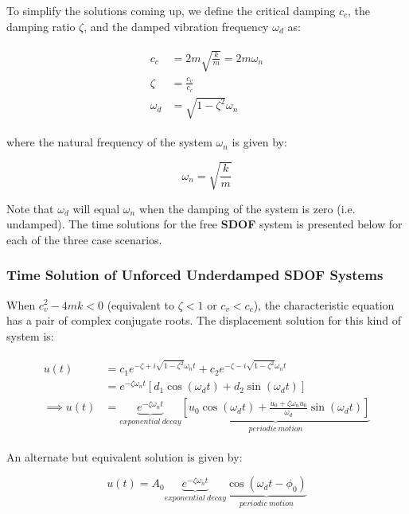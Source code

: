 \documentclass[10pt,b5paper,titlepage]{book}
\newenvironment{ematrix}
{
    \begin{eqnarray}
        \begin{aligned}
}
{
        \end{aligned}
    \end{eqnarray}
}
\begin{document}
To simplify the solutions coming up, we define the critical damping $ c_c $,
the damping ratio $ \zeta $, and the damped vibration frequency $ \omega_d $ as:

\begin{ematrix}
    c_c &= 2 m \sqrt{\frac{k}{m}} = 2 m \omega_n\\
    \zeta &= \frac{c_v}{c_c}\\
    \omega_d &= \sqrt{1 - \zeta^2} \omega_n
\end{ematrix}

where the natural frequency of the system $ \omega_n $ is given by:

\begin{equation}
    \omega_n = \sqrt{\frac{k}{m}}
\end{equation}

Note that $ \omega_d $ will equal $ \omega_n $ when the damping of the system
is zero (i.e. undamped). The time solutions for the free \textbf{SDOF}
system is presented below for each of the three case scenarios.

\subsubsection{Time Solution of Unforced Underdamped SDOF Systems}

When $ c_v^2 - 4 m k < 0 $ (equivalent to $ \zeta < 1 $ or $ c_v < c_c $),
the characteristic equation has a pair of complex conjugate roots. The displacement
solution for this kind of system is:

\begin{ematrix}
    u(t) &= c_1 e^{-\zeta + i \sqrt{1 - \zeta^2} \omega_n t}
          + c_2 e^{-\zeta - i \sqrt{1 - \zeta^2} \omega_n t}\\
         &= e^{-\zeta \omega_n t} \left[ d_1 \cos{(\omega_d t)}
                                       + d_2 \sin{(\omega_d t)} \right]\\
    \implies u(t) &= \underbrace{e^{-\zeta \omega_n t}}_{exponential\ decay}
    \underbrace{\left[ u_0 \cos{(\omega_d t)}
    + \frac{\dot{u}_0 + \zeta \omega_n u_0}{\omega_d} \sin{(\omega_d t)}
    \right]}_{periodic\ motion}
\end{ematrix}

An alternate but equivalent solution is given by:

\begin{equation}
    u(t) = A_0 \underbrace{e^{-\zeta \omega_n t}}_{exponential\ decay}
    \underbrace{\cos{(\omega_d t - \phi_0)}}_{periodic\ motion}
\end{equation}
\end{document}
